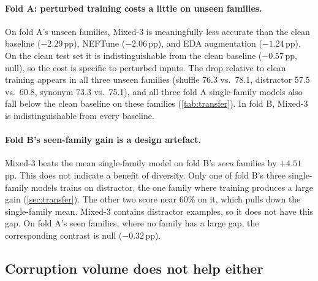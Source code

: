 \documentclass[11pt]{article}
\newcommand{\ppts}{\,pp}
\newcommand{\pfam}[1]{\textsf{#1}}
\begin{document}
\paragraph{Fold A: perturbed training costs a little on unseen families.} On fold A's unseen families, Mixed-3 is meaningfully less accurate than the clean baseline ($-2.29$\ppts{}), NEFTune ($-2.06$\ppts{}), and EDA augmentation ($-1.24$\ppts{}). On the clean test set it is indistinguishable from the clean baseline ($-0.57$\ppts{}, null), so the cost is specific to perturbed inputs. The drop relative to clean training appears in all three unseen families (\pfam{shuffle} 76.3 vs.\ 78.1, \pfam{distractor} 57.5 vs.\ 60.8, \pfam{synonym} 73.3 vs.\ 75.1), and all three fold A single-family models also fall below the clean baseline on these families (\cref{tab:transfer}). In fold B, Mixed-3 is indistinguishable from every baseline.

\paragraph{Fold B's seen-family gain is a design artefact.} Mixed-3 beats the mean single-family model on fold B's \emph{seen} families by $+4.51$\ppts{}. This does not indicate a benefit of diversity. Only one of fold B's three single-family models trains on \pfam{distractor}, the one family where training produces a large gain (\cref{sec:transfer}). The other two score near 60\% on it, which pulls down the single-family mean. Mixed-3 contains \pfam{distractor} examples, so it does not have this gap. On fold A's seen families, where no family has a large gap, the corresponding contrast is null ($-0.32$\ppts{}).

\subsection{Corruption volume does not help either}
\label{sec:sweep}
\end{document}
